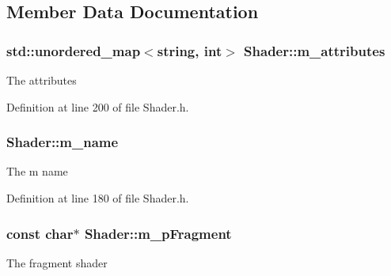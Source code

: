 \subsection{Member Data Documentation}
\subsubsection[{\texorpdfstring{m\+\_\+attributes}{m_attributes}}]{\setlength{\rightskip}{0pt plus 5cm}std\+::unordered\+\_\+map$<${\bf string}, int$>$ Shader\+::m\+\_\+attributes\hspace{0.3cm}{\ttfamily [private]}}\hypertarget{class_shader_afd151db19a90c4bf76fc07e4c291630e}{}\label{class_shader_afd151db19a90c4bf76fc07e4c291630e}


The attributes 



Definition at line 200 of file Shader.\+h.

\subsubsection[{\texorpdfstring{m\+\_\+name}{m_name}}]{ Shader\+::m\+\_\+name\hspace{0.3cm}{\ttfamily [private]}}\hypertarget{class_shader_a2bf551a2cc43f8057b308a59feb6aff5}{}\label{class_shader_a2bf551a2cc43f8057b308a59feb6aff5}


The m name 



Definition at line 180 of file Shader.\+h.

\subsubsection[{\texorpdfstring{m\+\_\+p\+Fragment}{m_pFragment}}]{\setlength{\rightskip}{0pt plus 5cm}const char$\ast$ Shader\+::m\+\_\+p\+Fragment\hspace{0.3cm}{\ttfamily [private]}}\hypertarget{class_shader_a77269206699768f0e80250cd304526c1}{}\label{class_shader_a77269206699768f0e80250cd304526c1}


The fragment shader 



